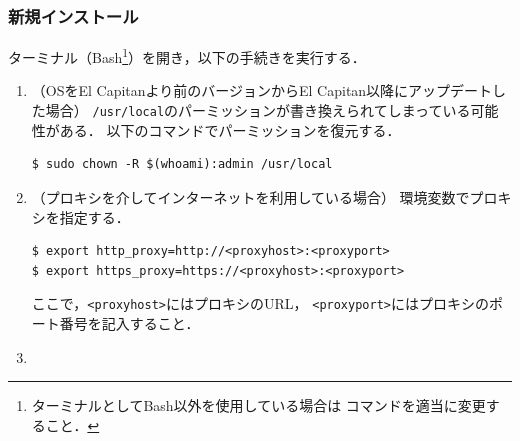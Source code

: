 \subsubsection{新規インストール}
ターミナル（Bash\footnote{%
ターミナルとしてBash以外を使用している場合は
コマンドを適当に変更すること．
}）を開き，以下の手続きを実行する．
\begin{enumerate}
\item
（OSをEl Capitanより前のバージョンからEl Capitan以降にアップデートした場合）
\verb|/usr/local|のパーミッションが書き換えられてしまっている可能性がある．
以下のコマンドでパーミッションを復元する．
\begin{lstlisting}[style=cmdline]
$ sudo chown -R $(whoami):admin /usr/local
\end{lstlisting}
\item
（プロキシを介してインターネットを利用している場合）
環境変数でプロキシを指定する．
\begin{lstlisting}[style=cmdline]
$ export http_proxy=http://<proxyhost>:<proxyport>
$ export https_proxy=https://<proxyhost>:<proxyport>
\end{lstlisting}
ここで，\verb|<proxyhost>|にはプロキシのURL，
\verb|<proxyport>|にはプロキシのポート番号を記入すること．
\item
{}
\end{enumerate}
